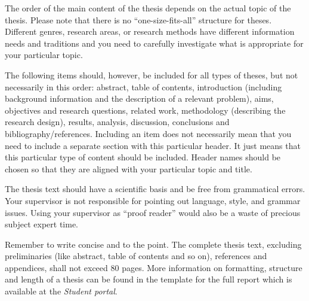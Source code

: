 \documentclass[a4paper,12pt]{book}
\begin{document}
The order of the main content of the thesis depends on the actual topic of the thesis.
Please note that there is no ``one-size-fits-all'' structure for theses.
Different genres, research areas, or research methods have different information needs and traditions
and you need to carefully investigate what is appropriate for your particular topic.

The following items should, however, be included for all types
of theses, but not necessarily in this order:
abstract, table of contents, introduction (including background information and the description of a
relevant problem), aims, objectives and research questions, related work, methodology
(describing the research design), results, analysis, discussion, conclusions and
bibliography/references.
Including an item does not necessarily mean that you need to include a separate
section with this particular header. It just means that this particular type of
content should be included. Header names should be chosen so that they are
aligned with your particular topic and title. 

The thesis text should have a scientific basis and be free from grammatical errors.
Your supervisor is not responsible for pointing out language, style, and grammar
issues.
Using your supervisor as ``proof reader'' would also be a waste of precious
subject expert time.

Remember to write concise and to the point. The complete thesis text,
excluding preliminaries (like abstract, table of contents and so on), references and appendices, shall not exceed 80 pages. More information on formatting, structure and length of a thesis can be found in the template for the full report which is available at the \emph{Student portal}. 


\end{document}

